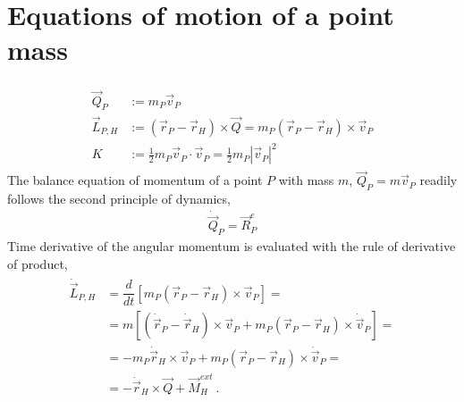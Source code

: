 \documentclass[letterpaper,10pt,english]{jupyterBook}
\begin{document}
\section{Equations of motion of a point mass}
\label{\detokenize{ch/dynamics-eom-point:equations-of-motion-of-a-point-mass}}\label{\detokenize{ch/dynamics-eom-point:classical-mechanics-dynamics-eom-point}}\label{\detokenize{ch/dynamics-eom-point::doc}}
\sphinxAtStartPar
{}
\begin{equation*}
\begin{split}\begin{aligned}
  \vec{Q}_P & := m_P \vec{v}_P \\
  \vec{L}_{P,H} & := (\vec{r}_P - \vec{r}_H) \times \vec{Q} = m_P (\vec{r}_P - \vec{r}_H) \times \vec{v}_P \\
  K & := \frac{1}{2} m_P \vec{v}_P \cdot \vec{v}_P = \frac{1}{2} m_P |\vec{v}_P|^2
\end{aligned}\end{split}
\end{equation*}
\sphinxAtStartPar
{} The balance equation of momentum of a point \(P\) with mass \(m\), \(\vec{Q}_P = m \vec{v}_P\) readily follows the second principle of dynamics,
\begin{equation*}
\begin{split}\dot{\vec{Q}}_P = \vec{R}^e_P\end{split}
\end{equation*}
\sphinxAtStartPar
{} Time derivative of the angular momentum is evaluated with the rule of derivative of product,
\begin{equation*}
\begin{split}\begin{aligned}
\dot{\vec{L}}_{P,H} & = \dfrac{d}{dt} \left[ m_P (\vec{r}_P - \vec{r}_H) \times \vec{v}_P \right] = \\
& = m \left[ ( \dot{\vec{r}}_P - \dot{\vec{r}}_H ) \times \vec{v}_P + m_P (\vec{r}_P - \vec{r}_H) \times \dot{\vec{v}}_P \right] = \\
& = - m_P \dot{\vec{r}}_H \times \vec{v}_P + m_P (\vec{r}_P - \vec{r}_H) \times \dot{\vec{v}}_P = \\
& = - \dot{\vec{r}}_H \times \vec{Q} + \vec{M}_H^{ext} \ .
\end{aligned}\end{split}
\end{equation*}
\sphinxAtStartPar
{}
\end{document}
